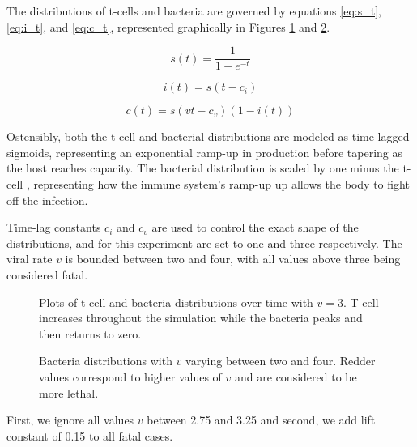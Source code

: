The distributions of t-cells and bacteria are governed by equations \ref{eq:s_t}, \ref{eq:i_t}, and \ref{eq:c_t}, represented graphically in Figures \ref{fig:pandemic_base_1} and \ref{fig:pandemic_base_2}. 

\begin{equation}
    \label{eq:s_t}
    s(t) = \frac{1}{1 + e^{-t}}
\end{equation}

\begin{equation}
    \label{eq:i_t}
    i(t) = s(t - c_i)
\end{equation}

\begin{equation}
    \label{eq:c_t}
    c(t) = s(v t - c_v) (1 - i(t))
\end{equation}

Ostensibly, both the t-cell and bacterial distributions are modeled as time-lagged sigmoids, representing an exponential ramp-up in production before tapering as the host reaches capacity. The bacterial distribution is scaled by one minus the t-cell , representing how the immune system's ramp-up up allows the body to fight off the infection. 

Time-lag constants $c_i$ and $c_v$ are used to control the exact shape of the distributions, and for this experiment are set to one and three respectively. The viral rate $v$ is bounded between two and four, with all values above three being considered fatal.

\begin{figure}
    
    \centering
    \caption{Plots of t-cell and bacteria distributions over time with $v = 3$. T-cell  increases throughout the simulation while the bacteria  peaks and then returns to zero.}
    \label{fig:pandemic_base_1}
\end{figure}


\begin{figure}
    
    \centering
    \caption{Bacteria distributions with $v$ varying between two and four. Redder values correspond to higher values of $v$ and are considered to be more lethal.}
    \label{fig:pandemic_base_2}
\end{figure}

 First, we ignore all values $v$ between 2.75 and 3.25 and second, we add lift constant of 0.15 to all fatal cases. 

